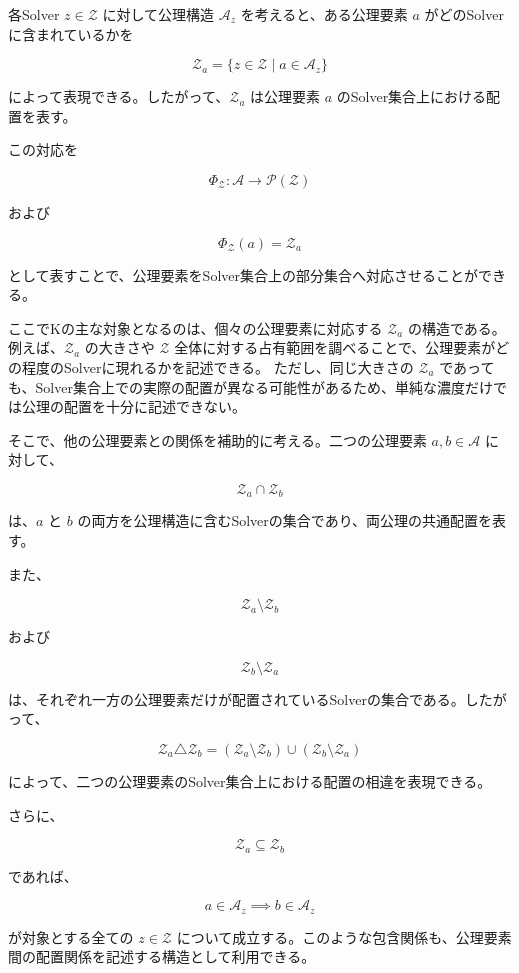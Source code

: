 各Solver $z\in\mathcal{Z}$ に対して公理構造 $\mathcal{A}_z$ を考えると、ある公理要素 $a$ がどのSolverに含まれているかを

\[
\mathcal{Z}_a = \{z\in\mathcal{Z}\mid a\in\mathcal{A}_z\}
\]

によって表現できる。したがって、$\mathcal{Z}_a$ は公理要素 $a$ のSolver集合上における配置を表す。

この対応を

\[
\Phi_{\mathcal{Z}}:\mathcal{A}\to\mathcal{P}(\mathcal{Z})
\]

および

\[
\Phi_{\mathcal{Z}}(a) = \mathcal{Z}_a
\]

として表すことで、公理要素をSolver集合上の部分集合へ対応させることができる。

ここでKの主な対象となるのは、個々の公理要素に対応する $\mathcal{Z}_a$ の構造である。
例えば、$\mathcal{Z}_a$ の大きさや $\mathcal{Z}$ 全体に対する占有範囲を調べることで、公理要素がどの程度のSolverに現れるかを記述できる。
ただし、同じ大きさの $\mathcal{Z}_a$ であっても、Solver集合上での実際の配置が異なる可能性があるため、単純な濃度だけでは公理の配置を十分に記述できない。

そこで、他の公理要素との関係を補助的に考える。二つの公理要素 $a,b\in\mathcal{A}$ に対して、

\[
\mathcal{Z}_a\cap\mathcal{Z}_b
\]

は、$a$ と $b$ の両方を公理構造に含むSolverの集合であり、両公理の共通配置を表す。

また、

\[
\mathcal{Z}_a\setminus\mathcal{Z}_b
\]

および

\[
\mathcal{Z}_b\setminus\mathcal{Z}_a
\]

は、それぞれ一方の公理要素だけが配置されているSolverの集合である。したがって、

\[
\mathcal{Z}_a\triangle\mathcal{Z}_b = (\mathcal{Z}_a\setminus\mathcal{Z}_b) \cup (\mathcal{Z}_b\setminus\mathcal{Z}_a)
\]

によって、二つの公理要素のSolver集合上における配置の相違を表現できる。

さらに、

\[
\mathcal{Z}_a\subseteq\mathcal{Z}_b
\]

であれば、

\[
a\in\mathcal{A}_z
\implies
b\in\mathcal{A}_z
\]

が対象とする全ての $z\in\mathcal{Z}$ について成立する。このような包含関係も、公理要素間の配置関係を記述する構造として利用できる。

